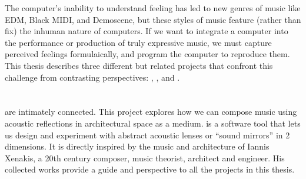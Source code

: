 The computer's inability to understand feeling has led to new genres
of music like EDM, Black MIDI, and
Demoscene, but these styles of
music feature (rather than fix) the inhuman nature of computers. If we
want to integrate a computer into the performance or production of
truly expressive music, we must capture perceived feelings
formulaically, and program the computer to reproduce them. This thesis
describes three different but related projects that confront this
challenge from contrasting perspectives: , \polytempic, and
\thesis.

\section{}
\label{sec:refmod-intro}
 are intimately connected. This project
explores how we can compose music using acoustic reflections in
architectural space as a medium.  is a software tool that lets
us design and experiment with abstract acoustic lenses or ``sound
mirrors'' in 2 dimensions. It is directly inspired by the music and
architecture of Iannis Xenakis, a 20th century composer, music
theorist, architect and engineer. His collected works provide a guide
and perspective to all the projects in this thesis.

\section{\polytempic}
\label{sec:polytempic-intro}

